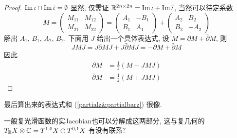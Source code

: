             \begin{proof}
                ${\rm Im}\,\iota\cap{\rm Im}\,\bar{\iota}=\emptyset$ 显然, 仅需证 $\mathbb{R}^{2n\times2n} = {\rm Im}\,\iota+{\rm Im}\,\bar{\iota}$,
                当然可以待定系数
                \begin{equation*}
                    M =  \begin{pmatrix} M_{11} & M_{12} \\ M_{21} & M_{22} \end{pmatrix} = 
                    \begin{pmatrix} A_1 & -B_1 \\ B_1 & A_1 \end{pmatrix} + 
                    \begin{pmatrix} A_2 & B_2 \\ B_2 & -A_2 \end{pmatrix}
                \end{equation*}
                解出 $A_1,\,B_1,\,A_2,\,B_2$. 下面用 $J$ 给出一个具体表达式, 设 $M = \partial M + \bar{\partial}M$, 则
                \begin{equation*}
                    JMJ = J\partial MJ + J\bar{\partial}MJ = -\partial M + \bar{\partial}M
                \end{equation*}
                因此
                \begin{equation}
                    \begin{aligned}
                        \partial M &= \frac{1}{2}(M - JMJ) \\
                    \bar{\partial}M &= \frac{1}{2}(M + JMJ)
                    \end{aligned}
                \end{equation}
            \end{proof}
            \begin{remark}
                最后算出来的表达式和 {\rm (\ref{partialz&partialbarz})} 很像.
            \end{remark}
            \begin{remark}
                一般复光滑函数的实{\rm Jacobian}也可以分解成这两部分, 这与复几何的 $T_{\mathbb{R}}X\otimes\mathbb{C} = T^{1,0}X\oplus T^{0,1}X$ 有没有联系?
            \end{remark}
    

